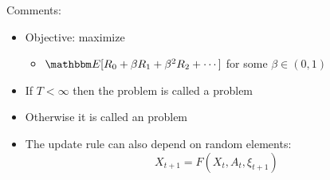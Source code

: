 \begin{frame}
    
    Comments:
    \begin{itemize}
        \item Objective: maximize 
            \vspace{0.3em}
            \vspace{0.3em}
        \begin{itemize}
            \vspace{0.3em}
            \vspace{0.3em}
            \item \Eg $\EE [ R_0 + \beta R_1 + \beta^2 R_2 + \cdots]$ for
                some $\beta \in (0, 1)$
        \end{itemize}
            \vspace{0.3em}
            \vspace{0.3em}
            \vspace{0.3em}
        \item If $T < \infty$ then the problem is called a  problem  
            \vspace{0.3em}
            \vspace{0.3em}
            \vspace{0.3em}
            \vspace{0.3em}
        \item Otherwise it is called an  problem
            \vspace{0.3em}
            \vspace{0.3em}
            \vspace{0.3em}
            \vspace{0.3em}
            \vspace{0.3em}
        \item The update rule can also depend on random elements:
            \begin{equation*}
                X_{t+1} = F(X_t, A_t, \xi_{t+1})
            \end{equation*}
    \end{itemize}

\end{frame}




